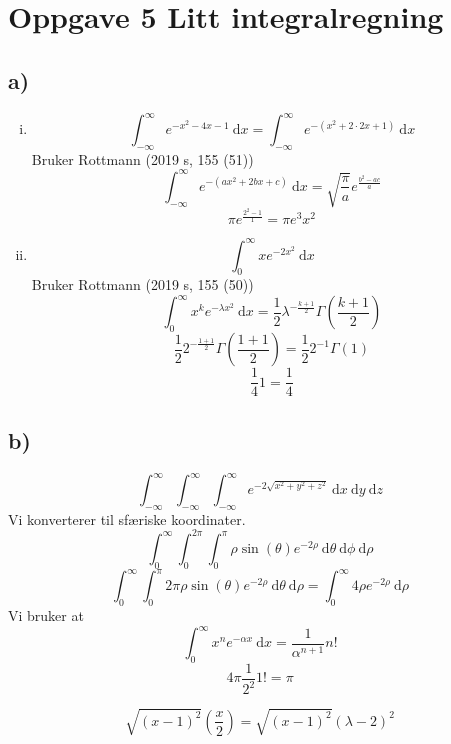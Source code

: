 \documentclass{article}
\begin{document}
\section*{Oppgave 5 Litt integralregning}
\subsection*{a)}
\begin{enumerate}[(i)]
    \item 
    \[
    ∫_{-∞}^{∞} e^{-x^{2} - 4x - 1} \ \mathrm{d}x = ∫_{-∞}^{∞} e^{-\left( x^{2} + 2 ⋅ 2x + 1 \right) } \ \mathrm{d}x
    \]
    Bruker Rottmann (2019 s, 155 (51))
    \[
    ∫_{-∞}^{∞} e^{-\left( ax^{2} + 2bx + c \right) } \ \mathrm{d}x = \sqrt{\frac{π}{a}} e^{\frac{b^{2} - ac}{a}}
    \]
    \[
    π e^{\frac{2^{2} - 1}{1}} = π e^{3}  x^2  
    \] 
    \item   
    \[
    ∫_{0}^{∞} xe ^{-2x^{2}} \ \mathrm{d}x
    \]
    Bruker Rottmann (2019 s, 155 (50)) 
    \[
    ∫_{0}^{∞} x^{k} e^{- λx^{2}} \ \mathrm{d}x = \frac{1}{2} λ ^{-\frac{k + 1}{2}} Γ \left( \frac{k + 1}{2}\right) 
    \]
    \[
    \frac{1}{2}2^{- \frac{1 + 1}{2}} Γ\left( \frac{1+1}{2} \right) = \frac{1}{2} 2^{-1} Γ(1)  
    \]
    \[
    \frac{1}{4} 1 = \frac{1}{4}
    \]
\end{enumerate}
\subsection*{b)}
\[
∫_{-∞}^{∞} ∫_{-∞}^{∞} ∫_{-∞}^{∞} e^{-2 \sqrt{x^2 + y^2 + z^2 }} \ \mathrm{d}x \ \mathrm{d}y \ \mathrm{d}z
\]
Vi konverterer til sfæriske koordinater. 
\[
∫_{0}^{∞} ∫_{0}^{2π} ∫_{0}^{π} ρ \sin (θ) e^{-2ρ}  \ \mathrm{d}θ \ \mathrm{d}ϕ \ \mathrm{d}ρ
\]
\[
∫_{0}^{∞} ∫_{0}^{π} 2π ρ \sin (θ) e^{-2ρ} \ \mathrm{d}θ \ \mathrm{d}ρ = ∫_{0}^{∞} 4 ρ e^{-2ρ} \ \mathrm{d}ρ
\]
Vi bruker at 
\[
∫_{0}^{∞} x^{n} e ^{-α x} \ \mathrm{d}x = \frac{1}{α^{n+1}}n!
\]
\[
4π\frac{1}{2^{2}} 1! = π 
\]

\[
\sqrt{\left( x - 1 \right)^{2} } \left(\frac{x}{2}\right) = \sqrt{\left( x - 1 \right)^{2} } 
\left( λ - 2 \right)^2 
\]
\end{document}
